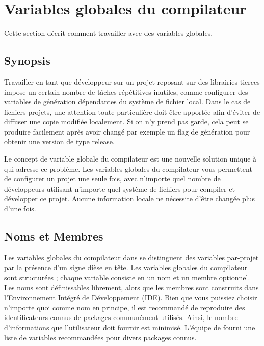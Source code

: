 
\section{Variables globales du compilateur}\label{sec:global_variables}

Cette section décrit comment travailler avec des variables globales.

\subsection{Synopsis}

Travailler en tant que développeur sur un projet reposant sur des librairies tierces impose un certain nombre de tâches répétitives inutiles, comme configurer des variables de génération dépendantes du système de fichier local. Dans le cas de fichiers projets, une attention toute particulière doit être apportée afin d'éviter de diffuser une copie modifiée localement. Si on n'y prend pas garde, cela peut se produire facilement après avoir changé par exemple un flag de génération  pour obtenir une version de type release.

Le concept de variable globale du compilateur est une nouvelle solution unique à \codeblocks qui adresse ce problème. Les variables globales du compilateur vous permettent de configurer un projet une seule fois, avec n'importe quel nombre de développeurs utilisant n'importe quel système de fichiers pour compiler et développer ce projet. Aucune information locale ne nécessite d'être changée plus d'une fois.

\subsection{Noms et Membres}

Les variables globales du compilateur dans \codeblocks se distinguent des variables par-projet par la présence d'un signe dièse en tête. Les variables globales du compilateur sont structurées ; chaque variable consiste en un nom et un membre optionnel. Les noms sont définissables librement, alors que les membres sont construits dans l'Environnement Intégré de Développement (IDE). Bien que vous puissiez choisir n'importe quoi comme nom en principe, il est recommandé de reproduire des identificateurs connus de packages communément utilisés. Ainsi, le nombre d'informations que l'utilisateur doit fournir est minimisé. L'équipe de \codeblocks fourni une liste de variables recommandées pour divers packages connus.

